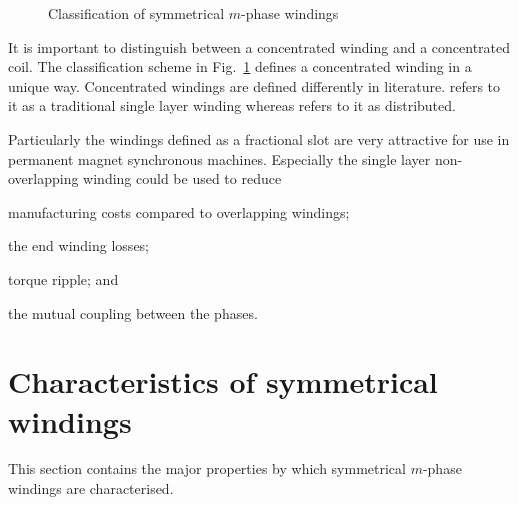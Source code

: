 \begin{figure}[htbp]
	\centering
		
  \caption{Classification of symmetrical $m$-phase windings}
	\label{fig:classification}
\end{figure} 

It is important to distinguish between a concentrated winding and a concentrated coil. The classification scheme in Fig.~\ref{fig:classification} defines a concentrated winding in a unique way. Concentrated windings are defined differently in literature. \cite{salminen_2004_IAS} refers to it as a traditional single layer winding whereas \cite{IR-EE-EME_2003:029} refers to it as distributed.

Particularly the windings defined as a fractional slot are very attractive for use in permanent magnet synchronous machines. Especially the single layer non-overlapping winding could be used to reduce
\begin{itemize*}
	\item manufacturing costs compared to overlapping windings;
	\item the end winding losses;
	\item torque ripple; and
	\item the mutual coupling between the phases.
\end{itemize*}

\section{Characteristics of symmetrical windings}
This section contains the major properties by which symmetrical $m$-phase windings are characterised.

